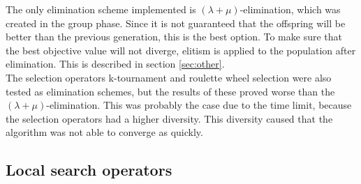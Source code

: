 \documentclass[a4paper,10pt]{article}
\newcommand{\ReplaceMe}[1]{{\color{blue}#1}}
\begin{document}
The only elimination scheme implemented is $(\lambda + \mu)$-elimination, which was created in the group phase. Since it is not guaranteed that the offspring will be better than the previous generation, this is the best option. To make sure that the best objective value will not diverge, elitism is applied to the population after elimination. This is described in section \ref{sec:other}.\\
The selection operators k-tournament and roulette wheel selection were also tested as elimination schemes, but the results of these proved worse than the $(\lambda + \mu)$-elimination. This was probably the case due to the time limit, because the selection operators had a higher diversity. This diversity caused that the algorithm was not able to converge as quickly.

\subsection{Local search operators}

\end{document}
